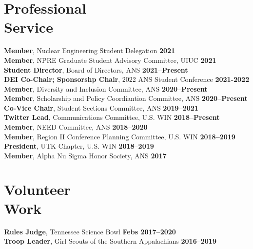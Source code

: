 \documentclass[margin,line]{resume}
\begin{document}
\begin{resume}
    \section{\mysidestyle Professional\\Service}
                \textbf{Member}, Nuclear Engineering Student Delegation \hfill \textbf{2021}\vspace{0.5mm}\\
                \textbf{Member}, NPRE Graduate Student Advisory Committee, UIUC \hfill \textbf{2021}\vspace{0.5mm}\\
                \textbf{Student Director}, Board of Directors, ANS \hfill \textbf{2021--Present}\vspace{.5mm}\\
                \textbf{DEI Co-Chair; Sponsorshp Chair}, 2022 ANS Student Conference  \hfill 
                \textbf{2021-2022} \\
                \textbf{Member}, Diversity and Inclusion Committee, ANS  \hfill \textbf{2020--Present}\vspace{.5mm}\\%
                \textbf{Member}, Scholarship and Policy Coordiantion Committee, ANS  \hfill \textbf{2020--Present}\vspace{.5mm}\\%
                \textbf{Co-Vice Chair}, Student Sections Committee, ANS  \hfill \textbf{2019--2021}\vspace{.5mm}\\%
                \textbf{Twitter Lead}, Communications Committee, U.S. WIN  \hfill \textbf{2018--Present}\vspace{.5mm}\\%
                \textbf{Member}, NEED Committee, ANS  \hfill \textbf{2018--2020}\vspace{.5mm}\\%
                \textbf{Member}, Region II Conference Planning Committee, U.S. WIN  \hfill \textbf{2018--2019}\vspace{.5mm}\\%
                \textbf{President}, UTK Chapter, U.S. WIN  \hfill \textbf{2018--2019}\vspace{.5mm}\\%
                \textbf{Member}, Alpha Nu Sigma Honor Society, ANS \hfill \textbf{2017}\vspace{.5mm}%
    
    \section{\mysidestyle Volunteer\\Work}
                \textbf{Rules Judge}, Tennessee Science Bowl \hfill \textbf{Febs 2017--2020}\\
                \textbf{Troop Leader}, Girl Scouts of the Southern Appalachians \hfill \textbf{2016--2019}\vspace{.5mm}\\%
                

\end{resume}
\end{document}
